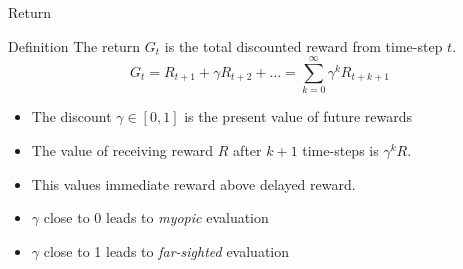 \bgroup
\begin{frame}{Return}
\begin{block}{Definition}
The return $G_t$ is the total discounted reward from time-step $t$.
\begin{equation*}
G_t = R_{t+1} + \gamma R_{t+2} + \ldots = \sum_{k=0}^{\infty} \gamma^{k}R_{t+k+1}
\end{equation*}
\end{block}
\begin{itemize}
\item The discount $\gamma \in [0, 1]$ is the present value of future rewards
\item The value of receiving reward $R$ after $k + 1$ time-steps is $\gamma^{k} R$.
\item This values immediate reward above delayed reward.
\item $\gamma$ close to 0 leads to \emph{myopic} evaluation
\item $\gamma$ close to 1 leads to \emph{far-sighted} evaluation
\end{itemize}
\end{frame}
\egroup